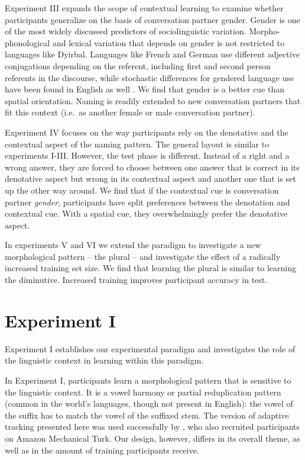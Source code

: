 \documentclass{frontiersSCNS} %
\begin{document}
Experiment III expands the scope of contextual learning to examine whether participants generalize on the basis of conversation partner gender. Gender is one of the most widely discussed predictors of sociolinguistic variation. Morpho-phonological and lexical variation that depends on gender is not restricted to languages like Dyirbal. Languages like French and German use different adjective conjugations depending on the referent, including first and second person referents in the discourse, while stochastic differences for gendered language use have been found in English as well \citep{walkerhay2013}. We find that gender is a better cue than spatial orientation. Naming is readily extended to new conversation partners that fit this context (i.e.\ as another female or male conversation partner).

Experiment IV focuses on the way participants rely on the denotative and the contextual aspect of the naming pattern. The general layout is similar to experiments I-III. However, the test phase is different. Instead of a right and a wrong answer, they are forced to choose between one answer that is correct in its denotative aspect but wrong in its contextual aspect and another one that is set up the other way around. We find that if the contextual cue is conversation partner \emph{gender}, participants have split preferences between the denotation and contextual cue. With a spatial cue, they overwhelmingly prefer the denotative aspect.

In experiments V and VI we extend the paradigm to investigate a new morphological pattern -- the plural -- and investigate the effect of a radically increased training set size. We find that learning the plural is similar to learning the diminutive. Increased training improves participant accuracy in test.

\section{Experiment I}


Experiment I establishes our experimental paradigm and investigates the role of the linguistic context in learning within this paradigm.


In Experiment I, participants learn a morphological pattern that is sensitive to the linguistic context. It is a vowel harmony or partial reduplication pattern (common in the world's languages, though not present in English): the vowel of the suffix has to match the vowel of the suffixed stem. The version of adaptive tracking presented here was used successfully by \cite{schumacher2014}, who also recruited participants on Amazon Mechanical Turk. Our design, however, differs in its overall theme, as well as in the amount of training participants receive.
\end{document}
